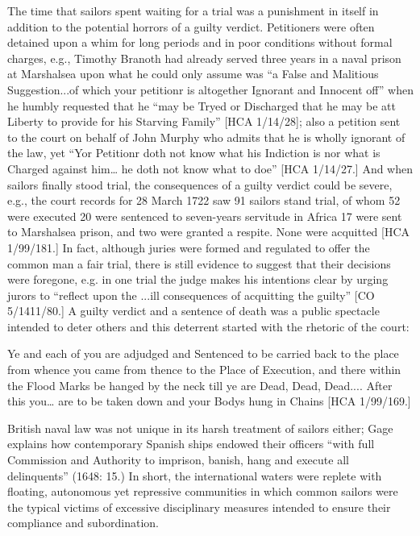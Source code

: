 \begin{styleStandard}
\end{styleStandard}

\begin{styleStandard}
The time that sailors spent waiting for a trial was a punishment in itself in addition to the potential horrors of a guilty verdict. Petitioners were often detained upon a whim for long periods and in poor conditions without formal charges, e.g., Timothy Branoth had already served three years in a naval prison at Marshalsea upon what he could only assume was “a False and Malitious Suggestion...of which your petitionr is altogether Ignorant and Innocent off” when he humbly requested that he “may be Tryed or Discharged that he may be att Liberty to provide for his Starving Family” [HCA 1/14/28]; also a petition sent to the court on behalf of John Murphy who admits that he is wholly ignorant of the law, yet “Yor Petitionr doth not know what his Indiction is nor what is Charged against him… he doth not know what to doe” [HCA 1/14/27.] And when sailors finally stood trial, the consequences of a guilty verdict could be severe, e.g., the court records for 28 March 1722 saw 91 sailors stand trial, of whom 52 were executed 20 were sentenced to seven-years servitude in Africa 17 were sent to Marshalsea prison, and two were granted a respite. None were acquitted [HCA 1/99/181.] In fact, although juries were formed and regulated to offer the common man a fair trial, there is still evidence to suggest that their decisions were foregone, e.g. in one trial the judge makes his intentions clear by urging jurors to “reflect upon the ...ill consequences of acquitting the guilty” [CO 5/1411/80.] A guilty verdict and a sentence of death was a public spectacle intended to deter others and this deterrent started with the rhetoric of the court: 
\end{styleStandard}

\begin{styleStandard}
Ye and each of you are adjudged and Sentenced to be carried back to the place from whence you came from thence to the Place of Execution, and there within the Flood Marks be hanged by the neck till ye are Dead, Dead, Dead.... After this you… are to be taken down and your Bodys hung in Chains [HCA 1/99/169.] 
\end{styleStandard}

\begin{styleStandard}
British naval law was not unique in its harsh treatment of sailors either; Gage explains how contemporary Spanish ships endowed their officers “with full Commission and Authority to imprison, banish, hang and execute all delinquents” (1648: 15.) In short, the international waters were replete with floating, autonomous yet repressive communities in which common sailors were the typical victims of excessive disciplinary measures intended to ensure their compliance and subordination. 
\end{styleStandard}

